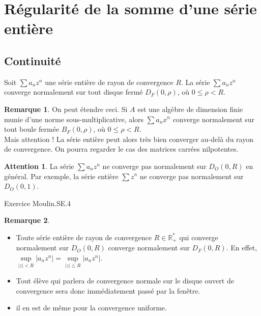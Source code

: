 \documentclass[french]{article}
\newcommand{\R}{\mathbb{R}}
\newcommand{\st}{^*}
\theoremstyle{plain}
\theoremstyle{definition}
\newtheorem*{rmq}{Remarque}
\newtheorem*{attention}{Attention}
\theoremstyle{remark}
\begin{document}
\section{Régularité de la somme d'une série entière}

\subsection{Continuité}

\begin{thm}%
	Soit $\displaystyle\sum a_n z^n$ une série entière de rayon de convergence $R$. La série $\displaystyle \sum a_n z^n$ converge normalement sur tout disque fermé $D_F(0,\rho)$, où $0\leqslant\rho<R$.
\end{thm}

\begin{rmq}
	On peut étendre ceci. Si $A$ est une algèbre de dimension finie munie d'une norme sous-multiplicative, alors $\displaystyle\sum a_nx^n$ converge normalement sur tout boule fermée $B_F(0,\rho)$, où $0\leqslant\rho < R$. \\
	Mais attention ! La série entière peut alors très bien converger au-delà du rayon de convergence. On pourra regarder le cas des matrices carrées nilpotentes.
\end{rmq}

\begin{attention}
	La série $\displaystyle\sum a_n z^n$ ne converge pas normalement sur $D_O(0,R)$ en général. Par exemple, la série entière $\displaystyle\sum z^n$ ne converge pas normalement sur $D_O(0,1)$.
\end{attention}

Exercice Moulin.SE.4

\begin{rmq}
	\begin{itemize}
		\item Toute série entière de rayon de convergence $R\in\R_+\st$ qui converge normalement sur $D_O(0,R)$ converge normalement sur $D_F(0,R)$. En effet, $\displaystyle\underset{\lvert z\rvert <R}{\sup}\lvert a_n z^n\rvert=\underset{\lvert z\rvert\leqslant R}{\sup}\lvert a_n z^n\rvert$.
		\item Tout élève qui parlera de convergence normale sur le disque ouvert de convergence sera donc immédiatement passé par la fenêtre.
		\item il en est de même pour la convergence uniforme.
	\end{itemize}
\end{rmq}
\end{document}
